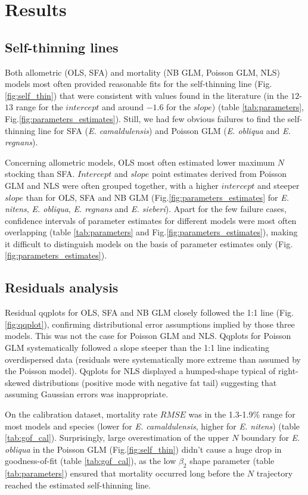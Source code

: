 \documentclass[12pt,english]{article}
\begin{document}
\newpage
\section {Results}
\subsection{Self-thinning lines}

Both allometric (OLS, SFA) and mortality (NB GLM, Poisson GLM, NLS) models most often provided reasonable fits for the self-thinning line (Fig.\ref{fig:self_thin}) that were consistent with values found in the literature (in the $12$-$13$ range for the $intercept$ and around $-1.6$ for the $slope$) (table \ref{tab:parameters}, Fig.\ref{fig:parameters_estimates}). Still, we had few obvious failures to find the self-thinning line for SFA (\textit{E. camaldulensis}) and Poisson GLM (\textit{E. obliqua} and \textit{E. regnans}). 

Concerning allometric models, OLS most often estimated lower maximum $N$ stocking than SFA. $Intercept$ and $slope$ point estimates derived from Poisson GLM and NLS were often grouped together, with a higher $intercept$ and steeper $slope$ than for OLS, SFA and NB GLM (Fig.\ref{fig:parameters_estimates} for \textit{E. nitens}, \textit{E. obliqua}, \textit{E. regnans} and \textit{E. sieberi}). Apart for the few failure cases, confidence intervals of parameter estimates for different models were most often overlapping (table \ref{tab:parameters} and Fig.\ref{fig:parameters_estimates}), making it difficult to distinguish models on the basis of parameter estimates only (Fig.\ref{fig:parameters_estimates}).
	
        		      											
\subsection{Residuals analysis}
Residual qqplots for OLS, SFA and NB GLM closely followed the 1:1 line (Fig.\ref{fig:qqplot}), confirming distributional error assumptions implied by those three models. This was not the case for Poisson GLM and NLS. Qqplots for Poisson GLM systematically followed a slope steeper than the 1:1 line indicating overdispersed data (residuals were systematically more extreme than assumed by the Poisson model). Qqplots for NLS displayed a humped-shape typical of right-skewed distributions (positive mode with negative fat tail) suggesting that assuming Gaussian errors was inappropriate.

On the calibration dataset, mortality rate $RMSE$ was in the 1.3-1.9\% range for most models and species (lower for \textit{E. camaldulensis}, higher for \textit{E. nitens}) (table \ref{tab:gof_cal}). Surprisingly, large overestimation of the upper $N$ boundary for \textit{E. obliqua} in the Poisson GLM (Fig.\ref{fig:self_thin}) didn't cause a huge drop in goodness-of-fit (table \ref{tab:gof_cal}), as the low $\beta_2$ shape parameter (table \ref{tab:parameters}) ensured that mortality occurred long before the $N$ trajectory reached the estimated self-thinning line.
\end{document}
